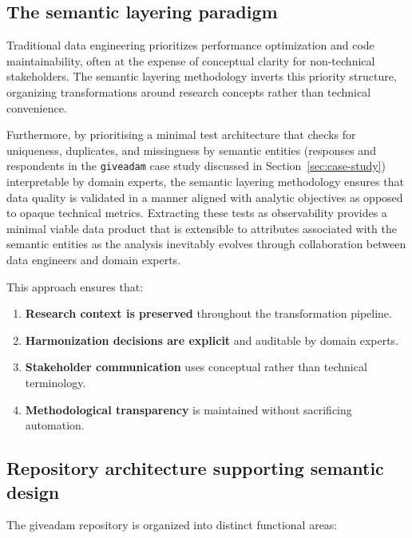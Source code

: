 \documentclass{article}
\begin{document}
\subsection{The semantic layering paradigm}
\label{subsec:semantic-paradigm}

Traditional data engineering prioritizes performance optimization and code maintainability, often at the expense of conceptual clarity for non-technical stakeholders. The semantic layering methodology inverts this priority structure, organizing transformations around research concepts rather than technical convenience. 

Furthermore, by prioritising a minimal test architecture that checks for uniqueness, duplicates, and missingness by semantic entities (responses and respondents in the \texttt{giveadam} case study discussed in Section~\ref{sec:case-study}) interpretable by domain experts, the semantic layering methodology ensures that data quality is validated in a manner aligned with analytic objectives as opposed to opaque technical metrics. Extracting these tests as observability provides a minimal viable data product that is extensible to attributes associated with the semantic entities as the analysis inevitably evolves through collaboration between data engineers and domain experts.

This approach ensures that:

\begin{enumerate}
    \item \textbf{Research context is preserved} throughout the transformation pipeline.
    \item \textbf{Harmonization decisions are explicit} and auditable by domain experts.
    \item \textbf{Stakeholder communication} uses conceptual rather than technical terminology.
    \item \textbf{Methodological transparency} is maintained without sacrificing automation.
\end{enumerate}

\subsection{Repository architecture supporting semantic design}
\label{sec:repository-arch}

The giveadam repository is organized into distinct functional areas:
\end{document}
